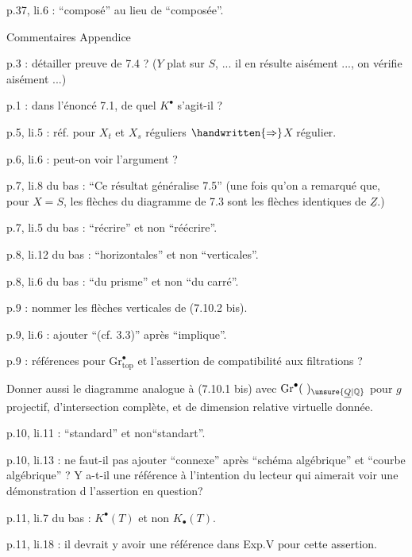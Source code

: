 
p.37, li.6 : ``composé'' au lieu de ``composée''.

\begin{center}
Commentaires Appendice
\end{center}

p.3 : détailler preuve de 7.4 ? ($Y$ plat sur $S$, ... il en résulte aisément ..., on vérifie aisément ...)

p.1 : dans l'énoncé 7.1, de quel $K^{\bullet}$ s'agit-il ?

p.5, li.5 : réf. pour $X_t$ et $X_s$ réguliers $\handwritten{\Rightarrow}$$X$ régulier.

p.6, li.6 : peut-on voir l'argument ?

p.7, li.8 du bas : ``Ce résultat généralise 7.5'' (une fois qu'on a remarqué que, pour $X = S$, les flèches du diagramme de 7.3 sont les flèches identiques de $\underline{Z}$.)

p.7, li.5 du bas : ``récrire'' et non ``réécrire''.

p.8, li.12 du bas : ``horizontales'' et non ``verticales''.

p.8, li.6 du bas : ``du prisme'' et non ``du carré''.

p.9 : nommer les flèches verticales de (7.10.2 bis).

p.9, li.6 : ajouter ``(cf. 3.3)'' après ``implique''.

p.9 : références pour $\mathrm{Gr}^{\bullet}_{\mathrm{top}}$ et l'assertion de compatibilité aux filtrations ?

Donner aussi le diagramme analogue à (7.10.1 bis) avec $\mathrm{Gr}^{\bullet}(\ )_{\unsure{\underline{Q}|\mathbb{Q}}}$ pour $g$ projectif, d'intersection complète, et de dimension relative virtuelle donnée.

p.10, li.11 : ``standard'' et non``standart''.

p.10, li.13 : ne faut-il pas ajouter ``connexe'' après ``schéma algébrique'' et ``courbe algébrique'' ? Y a-t-il une référence à l'intention du lecteur qui aimerait voir une démonstration d l'assertion en question?


p.11, li.7 du bas : $K^{\bullet}(T)$ et non $K_{\bullet}(T)$.

p.11, li.18 : il devrait y avoir une référence dans Exp.V pour cette assertion.

